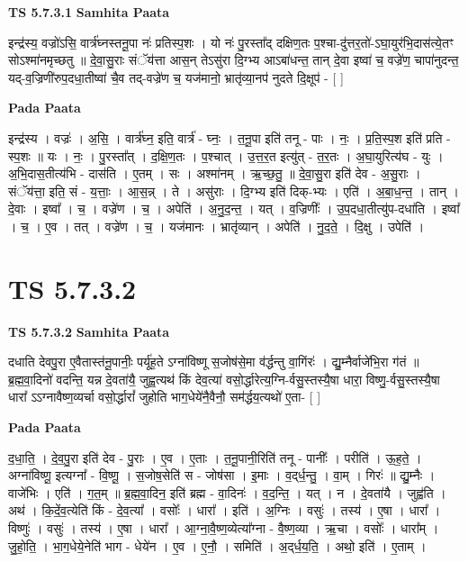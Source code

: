 \documentclass[17pt]{extarticle}
\begin{document}
\textbf{TS 5.7.3.1 } \newline
\textbf{Samhita Paata} \newline

इन्द्र॑स्य॒ वज्रो॑ऽसि॒ वार्त्र॑घ्नस्तनू॒पा नः॑ प्रतिस्प॒शः । यो नः॑ पु॒रस्ता᳚द् दक्षिण॒तः प॒श्चा-दु॑त्तर॒तो॑-ऽघा॒युर॑भि॒दास॑त्ये॒तꣳ सोऽश्मा॑नमृच्छतु ॥ दे॒वा॒सु॒राः संॅय॑त्ता आस॒न् तेऽसु॑रा दि॒ग्भ्य आऽबा॑धन्त॒ तान् दे॒वा इष्वा॑ च॒ वज्रे॑ण॒ चापा॑नुदन्त॒ यद्-व॒ज्रिणी॑रुप॒दधा॒तीष्वा॑ चै॒व तद्-वज्रे॑ण च॒ यज॑मानो॒ भ्रातृ॑व्या॒नप॑ नुदते दि॒क्षूप॑ - [  ] \newline

\textbf{Pada Paata} \newline

इन्द्र॑स्य । वज्रः॑ । अ॒सि॒ । वार्त्र॑घ्न॒ इति॒ वार्त्र॑ - घ्नः॒ । त॒नू॒पा इति॑ तनू - पाः । नः॒ । प्र॒ति॒स्प॒श इति॑ प्रति - स्प॒शः ॥ यः । नः॒ । पु॒रस्ता᳚त् । द॒क्षि॒ण॒तः । प॒श्चात् । उ॒त्त॒र॒त इत्यु॑त् - त॒र॒तः । अ॒घा॒युरित्य॑घ - युः । अ॒भि॒दास॒तीत्य॑भि - दास॑ति । ए॒तम् । सः । अश्मा॑नम् । ऋ॒च्छ॒तु॒ ॥ दे॒वा॒सु॒रा इति॑ देव - अ॒सु॒राः । संॅय॑त्ता॒ इति॒ सं - य॒त्ताः॒ । आ॒स॒न्न् । ते । असु॑राः । दि॒ग्भ्य इति॑ दिक्-भ्यः । एति॑ । अ॒बा॒ध॒न्त॒ । तान् । दे॒वाः । इष्वा᳚ । च॒ । वज्रे॑ण । च॒ । अपेति॑ । अ॒नु॒द॒न्त॒ । यत् । व॒ज्रिणीः᳚ । उ॒प॒दधा॒तीत्यु॑प-दधा॑ति । इष्वा᳚ । च॒ । ए॒व । तत् । वज्रे॑ण । च॒ । यज॑मानः । भ्रातृ॑व्यान् । अपेति॑ । नु॒द॒ते॒ । दि॒क्षु । उपेति॑ ।  \newline




\section*{ TS 5.7.3.2 }

\textbf{TS 5.7.3.2 } \newline
\textbf{Samhita Paata} \newline

दधाति देवपु॒रा ए॒वैतास्त॑नू॒पानीः॒ पर्यू॑ह॒ते ऽग्ना॑विष्णू स॒जोष॑से॒मा व॑र्द्धन्तु वा॒गिंरः॑ । द्यु॒म्नैर्वाजे॑भि॒रा ग॑तं ॥ ब्र॒ह्म॒वा॒दिनो॑ वदन्ति॒ यन्न दे॒वता॑यै॒ जुह्व॒त्यथ॑ किं देव॒त्या॑ वसो॒र्द्धारेत्य॒ग्नि-र्वसु॒स्तस्यै॒षा धारा॒ विष्णु॒-र्वसु॒स्तस्यै॒षा धारा᳚ ऽऽग्नावैष्ण॒व्यर्चा वसो॒र्द्धारां᳚ जुहोति भाग॒धेये॑नै॒वैनौ॒ सम॑र्द्धय॒त्यथो॑ ए॒ता- [  ] \newline

\textbf{Pada Paata} \newline

द॒धा॒ति॒ । दे॒व॒पु॒रा इति॑ देव - पु॒राः । ए॒व । ए॒ताः । त॒नू॒पानी॒रिति॑ तनू - पानीः᳚ । परीति॑ । ऊ॒ह॒ते॒ । अग्ना॑विष्णू॒ इत्यग्ना᳚ - वि॒ष्णू॒ । स॒जोष॒सेति॑ स - जोष॑सा । इ॒माः । व॒द्‌र्ध॒न्तु॒ । वा॒म् । गिरः॑ ॥ द्यु॒म्नैः । वाजे॑भिः । एति॑ । ग॒त॒म् ॥ ब्र॒ह्म॒वा॒दिन॒ इति॑ ब्रह्म - वा॒दिनः॑ । व॒द॒न्ति॒ । यत् । न । दे॒वता॑यै । जुह्व॑ति । अथ॑ । कि॒दें॒व॒त्येति॑ किं - दे॒व॒त्या᳚ । वसोः᳚ । धारा᳚ । इति॑ । अ॒ग्निः । वसुः॑ । तस्य॑ । ए॒षा । धारा᳚ । विष्णुः॑ । वसुः॑ । तस्य॑ । ए॒षा । धारा᳚ । आ॒ग्ना॒वै॒ष्ण॒व्येत्या᳚ग्ना - वै॒ष्ण॒व्या । ऋ॒चा । वसोः᳚ । धारा᳚म् । जु॒हो॒ति॒ । भा॒ग॒धेये॒नेति॑ भाग - धेये॑न । ए॒व । ए॒नौ॒ । समिति॑ । अ॒द्‌र्ध॒य॒ति॒ । अथो॒ इति॑ । ए॒ताम् ।  \newline
\end{document}
